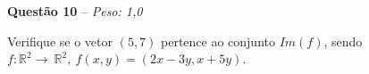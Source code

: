 \documentclass[a4paper,11pt]{article}
\begin{document}
\begin{mdframed}[backgroundcolor=gray!20]
\textbf{Questão 10} -- \textit{Peso: 1,0}
\end{mdframed}

Verifique se o vetor $(5,7)$ pertence ao conjunto $Im(f)$, sendo $f: \mathbb{R}^2 \longrightarrow \ \mathbb{R}^2, \ f(x,y)=(2x-3y, x+5y)$.\\


\begin{minipage}[t]{0.6\textwidth}
\end{minipage}
\hfill
\begin{minipage}[t]{0.3\textwidth}
\begin{flushright}
\end{flushright}
\end{minipage}
\end{document}
